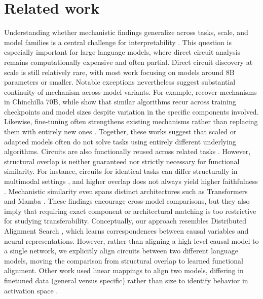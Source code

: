 \documentclass{article} %
\begin{document}
\section{Related work}
\label{sec:related-work}













Understanding whether mechanistic findings generalize across tasks, scale, and model families is a central challenge for interpretability \citep{wang2024universality, trott2025theory}. This question is especially important for large language models, where direct circuit analysis remains computationally expensive and often partial. Direct circuit discovery at scale is still relatively rare, with most work focusing on models around 8B parameters or smaller. Notable exceptions nevertheless suggest substantial continuity of mechanism across model variants. For example, \citet{lieberum2023scale} recover mechanisms in Chinchilla 70B, while \citet{tigges2024llm} show that similar algorithms recur across training checkpoints and model sizes despite variation in the specific components involved. Likewise, fine-tuning often strengthens existing mechanisms rather than replacing them with entirely new ones \citep{prakash2023fine}. Together, these works suggest that scaled or adapted models often do not solve tasks using entirely different underlying algorithms. Circuits are also functionally reused across related tasks \citep{merullo2024circuitreuse, lan2024towards, mondorf2025modular}. However, structural overlap is neither guaranteed nor strictly necessary for functional similarity. For instance, circuits for identical tasks can differ structurally in multimodal settings \citep{nikankin2025sametask}, and higher overlap does not always yield higher faithfulness \citep{hanna2024eapig}. Mechanistic similarity even spans distinct architectures such as Transformers and Mamba \citep{wang2024universality}. These findings encourage cross-model comparisons, but they also imply that requiring exact component or architectural matching is too restrictive for studying transferability. Conceptually, our approach resembles Distributed Alignment Search  \citep[DAS;][]{geiger2024finding}, which learns correspondences between causal variables and neural representations. However, rather than aligning a high-level causal model to a single network, we explicitly align circuits between two different language models, moving the comparison from structural overlap to learned functional alignment. %
Other work used linear mappings to align two models, differing in finetuned data (general versus specific) rather than size to identify behavior in activation space \cite{zhao-etal-2023-joint,zhao-etal-2024-layer}. %
\end{document}
